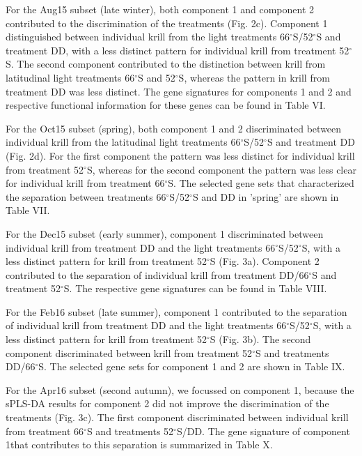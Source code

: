 For the Aug15 subset (late winter), both component 1 and component 2
contributed to the discrimination of the treatments (Fig. 2c). Component 1
distinguished between individual krill from the light treatments
66$^{\circ}$S/52$^{\circ}$S and treatment DD, with a less distinct pattern for
individual krill from treatment 52$^{\circ}$S. The second component contributed
to the distinction between krill from latitudinal light treatments
66$^{\circ}$S and 52$^{\circ}$S, whereas the pattern in krill from treatment DD
was less distinct. The gene signatures for components 1 and 2 and respective
functional information for these genes can be found in  Table VI.

For the Oct15 subset (spring), both component 1 and 2 discriminated between
individual krill from the latitudinal light treatments
66$^{\circ}$S/52$^{\circ}$S and treatment DD (Fig. 2d). For the first component
the pattern was less distinct for individual krill from treatment
52$^{\circ}$S, whereas for the second component the pattern was less clear for
individual krill from treatment 66$^{\circ}$S. The selected gene sets that
characterized the separation between treatments 66$^{\circ}$S/52$^{\circ}$S and
DD in 'spring' are shown in Table VII.

For the Dec15 subset (early summer), component 1 discriminated between
individual krill from treatment DD and the light treatments
66$^{\circ}$S/52$^{\circ}$S, with a less distinct pattern for krill from
treatment 52$^{\circ}$S (Fig. 3a). Component 2 contributed to the separation of
individual krill from treatment DD/66$^{\circ}$S and treatment 52$^{\circ}$S. The
respective gene signatures can be found in Table VIII.

For the Feb16 subset (late summer), component 1 contributed to the separation
of individual krill from treatment DD and the light treatments
66$^{\circ}$S/52$^{\circ}$S, with a less distinct pattern for krill from
treatment 52$^{\circ}$S (Fig. 3b). The second component discriminated between
krill from treatment 52$^{\circ}$S and treatments DD/66$^{\circ}$S. The selected
gene sets for component 1 and 2 are shown in Table IX.

For the Apr16 subset (second autumn), we focussed on component 1, because the
sPLS-DA results for component 2 did not improve the discrimination of the
treatments (Fig. 3c). The first component discriminated between individual
krill from treatment 66$^{\circ}$S and treatments 52$^{\circ}$S/DD. The gene
signature of component 1that contributes to this separation is summarized in
Table X.

